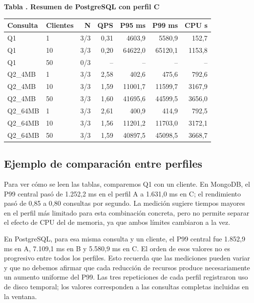 \documentclass[12pt,letterpaper]{article}
\begin{document}
\par\begin{minipage}{\textwidth}\begin{center}\textbf{Tabla \thetable. Resumen de PostgreSQL con perfil C}\par\small\begin{tabular}{llrrrrr}\toprule Consulta & Clientes & N & QPS & P95 ms & P99 ms & CPU s \\ \midrule
Q1 & 1 & 3/3 & 0,31 & 4603,9 & 5580,9 & 152,7 \\
Q1 & 10 & 3/3 & 0,20 & 64622,0 & 65120,1 & 1153,8 \\
Q1 & 50 & 0/3 & -- & -- & -- & -- \\
Q2\_4MB & 1 & 3/3 & 2,58 & 402,6 & 475,6 & 792,6 \\
Q2\_4MB & 10 & 3/3 & 1,59 & 11001,7 & 11599,7 & 3167,9 \\
Q2\_4MB & 50 & 3/3 & 1,60 & 41695,6 & 44599,5 & 3656,0 \\
Q2\_64MB & 1 & 3/3 & 2,61 & 400,9 & 414,9 & 792,5 \\
Q2\_64MB & 10 & 3/3 & 1,56 & 11201,2 & 11703,0 & 3172,1 \\
Q2\_64MB & 50 & 3/3 & 1,59 & 40897,5 & 45098,5 & 3668,7 \\
\bottomrule\end{tabular}\end{center}\end{minipage}\par


\subsection*{Ejemplo de comparación entre perfiles}
Para ver cómo se leen las tablas, comparemos Q1 con un cliente. En MongoDB, el P99 central pasó de 1.252,2 ms en el perfil A a 1.631,0 ms en C; el rendimiento pasó de 0,85 a 0,80 consultas por segundo. La medición sugiere tiempos mayores en el perfil más limitado para esta combinación concreta, pero no permite separar el efecto de CPU del de memoria, ya que ambos límites cambiaron a la vez.

En PostgreSQL, para esa misma consulta y un cliente, el P99 central fue 1.852,9 ms en A, 7.109,1 ms en B y 5.580,9 ms en C. El orden de esos valores no es progresivo entre todos los perfiles. Esto recuerda que las mediciones pueden variar y que no debemos afirmar que cada reducción de recursos produce necesariamente un aumento uniforme del P99. Las tres repeticiones de cada perfil registraron uso de disco temporal; los valores corresponden a las consultas completas incluidas en la ventana.
\end{document}
